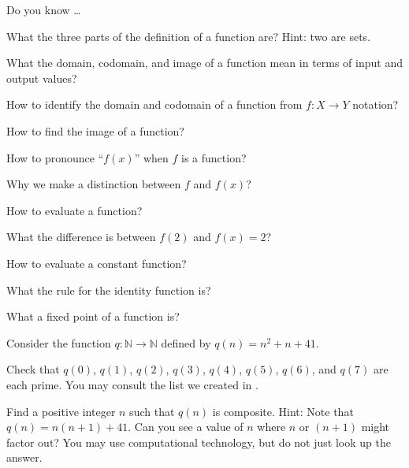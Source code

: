 \begin{exer}[\exerR] %
\label{exer_dyk_fn_vocab}
    Do you know \ldots
        \begin{exerpart}
            \item What the three parts of the definition of a function are? Hint: two are sets.
            \item What the domain, codomain, and image of a function mean in terms of input and output values?
            \item How to identify the domain and codomain of a function from $f: X \to Y$ notation?
            \item How to find the image of a function?
            \item How to pronounce ``$f(x)$'' when $f$ is a function?
            \item Why we make a distinction between $f$ and $f(x)$?
            \item How to evaluate a function?
            \item What the difference is between $f(2)$ and $f(x)=2$?
            \item How to evaluate a constant function?
            \item What the rule for the identity function is?
            \item What a fixed point of a function is?
        \end{exerpart}
\end{exer}

\begin{exer}[\exerE] %
\label{exer_prime_quadratic}
    Consider the function $q: \mathbb{N} \to \mathbb{N}$ defined by $q(n) = n^2+n+41$.
        \begin{exerpart}
            \item  Check that $q(0)$, $q(1)$, $q(2)$, $q(3)$, $q(4)$, $q(5)$, $q(6)$, and $q(7)$ are each prime.  You may consult the list we created in .
            \item Find a positive integer $n$ such that $q(n)$ is composite.  Hint: Note that $q(n) = n(n+1)+41$.  Can you see a value of $n$ where $n$ or $(n+1)$ might factor out? You may use computational technology, but do not just look up the answer.
        \end{exerpart}
\end{exer}

